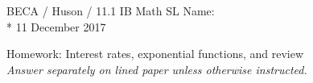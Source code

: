 \noindent BECA / Huson / 11.1 IB Math SL \hspace{2in} Name:\\*
11 December 2017
\begin{center}
{\Large Homework: Interest rates, exponential functions, and review}\\
\textit{Answer separately on lined paper unless otherwise instructed.}
\end{center}

